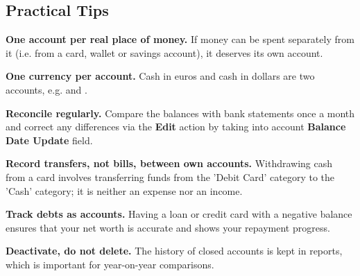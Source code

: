 \subsection{Practical Tips}

\textbf{One account per real place of money.} If money can be spent separately from it (i.e.
from a card, wallet or savings account), it deserves its own account.

\textbf{One currency per account.} Cash in euros and cash in dollars are two accounts, e.g.
 and .

\textbf{Reconcile regularly.} Compare the balances with bank statements once a month and
correct any differences via the \textbf{Edit} action by taking into account
\textbf{Balance Date Update} field.

\textbf{Record transfers, not bills, between own accounts.} Withdrawing cash from a card
involves transferring funds from the 'Debit Card' category to the 'Cash' category; it is
neither an expense nor an income.

\textbf{Track debts as accounts.} Having a loan or credit card with a negative balance
ensures that your net worth is accurate and shows your repayment progress.

\textbf{Deactivate, do not delete.} The history of closed accounts is kept in
reports, which is important for year-on-year comparisons.
